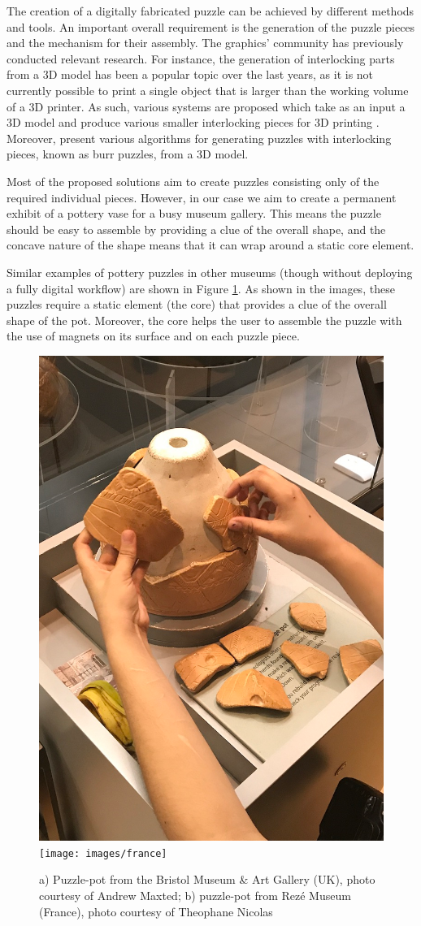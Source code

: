 \documentclass[acmlarge,screen]{acmart}
\begin{document}
The creation of a digitally fabricated puzzle can be achieved by different methods and tools. An important overall requirement is the generation of the puzzle pieces and the mechanism for their assembly. The graphics' community has previously conducted relevant research. For instance, the generation of interlocking parts from a 3D model has been a popular topic over the last years, as it is not currently possible to print a single object that is larger than the working volume of a 3D printer. As such, various systems are proposed which take as an input a 3D model and produce various smaller interlocking pieces for 3D printing \cite{Song:2015:POI:2797416.2797510,luo_chopper:_2012,klein_interlocking_2014,skouras_interactive_2015}. Moreover, \cite{Xin:2011:MBP:2010324.1964992,Song:2012:RIP:2366145.2366147,sun_computational_2015} present various algorithms for generating puzzles with interlocking pieces, known as burr puzzles, from a 3D model. 

Most of the proposed solutions aim to create puzzles consisting only of the required individual pieces. However, in our case we aim to create a permanent exhibit of a pottery vase for a busy museum gallery. This means the puzzle should be easy to assemble by providing a clue of the overall shape, and the concave nature of the shape means that it can wrap around a static core element. 

Similar examples of pottery puzzles in other museums (though without deploying a fully digital workflow) are shown in Figure \ref{fig:puz}. As shown in the images, these puzzles require a static element (the core) that provides a clue of the overall shape of the pot. Moreover, the core helps the user to assemble the puzzle with the use of magnets on its surface and on each puzzle piece. 


\begin{figure}[htb]
  \centering
  \includegraphics[width=0.45\linewidth]{images/uk}
    \texttt{[image: images/france]}
  \caption{\label{fig:puz}
    a) Puzzle-pot from the Bristol Museum \& Art Gallery (UK), photo courtesy of Andrew Maxted;
        b)  puzzle-pot from Rez\'e Museum (France), photo courtesy of Theophane Nicolas}
\end{figure}
  
\end{document}

